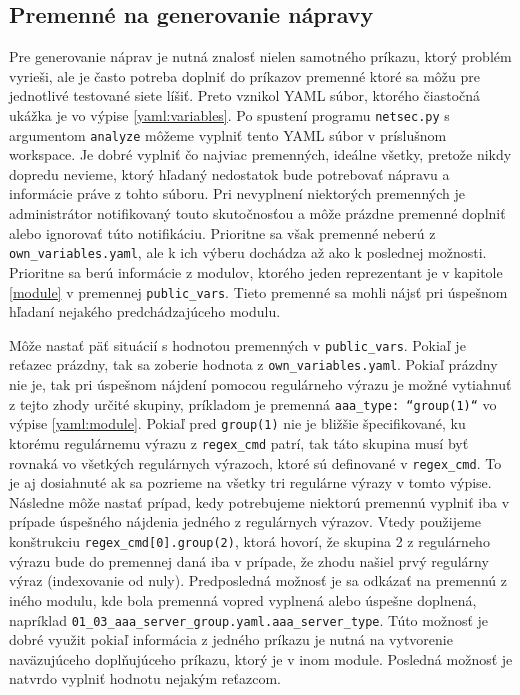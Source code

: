 \subsection{Premenné na generovanie nápravy}
\label{variables_generate}
Pre generovanie náprav je nutná znalosť nielen samotného príkazu, ktorý problém vyrieši, ale je často potreba doplniť do príkazov premenné ktoré sa môžu pre jednotlivé testované siete líšiť. Preto vznikol YAML súbor, ktorého čiastočná ukážka je vo výpise \ref{yaml:variables}. Po spustení programu \texttt{netsec.py} s argumentom \texttt{analyze} môžeme vyplniť tento YAML súbor v príslušnom workspace. Je dobré vyplniť čo najviac premenných, ideálne všetky, pretože nikdy dopredu nevieme, ktorý hľadaný nedostatok bude potrebovať nápravu a informácie práve z tohto súboru. Pri nevyplnení niektorých premenných je administrátor notifikovaný touto skutočnosťou a môže prázdne premenné doplniť alebo ignorovať túto notifikáciu. Prioritne sa však premenné neberú z \texttt{own\_variables.yaml}, ale k ich výberu dochádza až ako k poslednej možnosti. Prioritne sa berú informácie z modulov, ktorého jeden reprezentant je v kapitole \ref{module} v premennej \texttt{public\_vars}. Tieto premenné sa mohli nájsť pri úspešnom hľadaní nejakého predchádzajúceho modulu. 

Môže nastať päť situácií s hodnotou premenných v \texttt{public\_vars}. Pokiaľ je reťazec prázdny, tak sa zoberie hodnota z \texttt{own\_variables.yaml}. Pokiaľ prázdny nie je, tak pri úspešnom nájdení pomocou regulárneho výrazu je možné vytiahnuť z tejto zhody určité skupiny, príkladom je premenná \texttt{aaa\_type: ``group(1)``} vo výpise \ref{yaml:module}. Pokiaľ pred \texttt{group(1)} nie je bližšie špecifikované, ku ktorému regulárnemu výrazu z \texttt{regex\_cmd} patrí, tak táto skupina musí byť rovnaká vo všetkých regulárnych výrazoch, ktoré sú definované v \texttt{regex\_cmd}. To je aj dosiahnuté ak sa pozrieme na všetky tri regulárne výrazy v tomto výpise. Následne môže nastať prípad, kedy potrebujeme niektorú premennú vyplniť iba v prípade úspešného nájdenia jedného z regulárnych výrazov. Vtedy použijeme konštrukciu \texttt{regex\_cmd[0].group(2)}, ktorá hovorí, že skupina 2 z regulárneho výrazu bude do premennej daná iba v prípade, že zhodu našiel prvý regulárny výraz (indexovanie od nuly). Predposledná možnosť je sa odkázať na premennú z iného modulu, kde bola premenná vopred vyplnená alebo úspešne doplnená, napríklad \texttt{01\_03\_aaa\_server\_group.yaml.aaa\_server\_type}. Túto možnosť je dobré využit pokiaľ informácia z jedného príkazu je nutná na vytvorenie naväzujúceho doplňujúceho príkazu, ktorý je v inom module. Posledná možnosť je natvrdo vyplniť hodnotu nejakým reťazcom.

